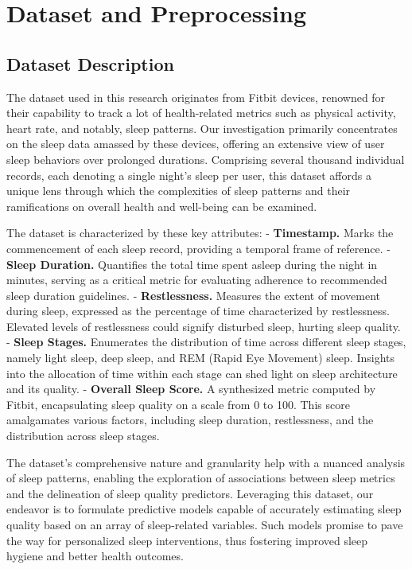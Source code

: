 \documentclass[10pt]{extarticle}
\begin{document}
\section{Dataset and Preprocessing}

\subsection{Dataset Description}

The dataset used in this research originates from Fitbit devices, renowned for their capability to track a lot of health-related metrics such as physical activity, heart rate, and notably, sleep patterns. Our investigation primarily concentrates on the sleep data amassed by these devices, offering an extensive view of user sleep behaviors over prolonged durations. Comprising several thousand individual records, each denoting a single night's sleep per user, this dataset affords a unique lens through which the complexities of sleep patterns and their ramifications on overall health and well-being can be examined.

The dataset is characterized by these key attributes:
- \textbf{Timestamp.} Marks the commencement of each sleep record, providing a temporal frame of reference.
- \textbf{Sleep Duration.} Quantifies the total time spent asleep during the night in minutes, serving as a critical metric for evaluating adherence to recommended sleep duration guidelines.
- \textbf{Restlessness.} Measures the extent of movement during sleep, expressed as the percentage of time characterized by restlessness. Elevated levels of restlessness could signify disturbed sleep, hurting sleep quality.
- \textbf{Sleep Stages.} Enumerates the distribution of time across different sleep stages, namely light sleep, deep sleep, and REM (Rapid Eye Movement) sleep. Insights into the allocation of time within each stage can shed light on sleep architecture and its quality.
- \textbf{Overall Sleep Score.} A synthesized metric computed by Fitbit, encapsulating sleep quality on a scale from 0 to 100. This score amalgamates various factors, including sleep duration, restlessness, and the distribution across sleep stages.

The dataset's comprehensive nature and granularity help with a nuanced analysis of sleep patterns, enabling the exploration of associations between sleep metrics and the delineation of sleep quality predictors. Leveraging this dataset, our endeavor is to formulate predictive models capable of accurately estimating sleep quality based on an array of sleep-related variables. Such models promise to pave the way for personalized sleep interventions, thus fostering improved sleep hygiene and better health outcomes.
\end{document}

